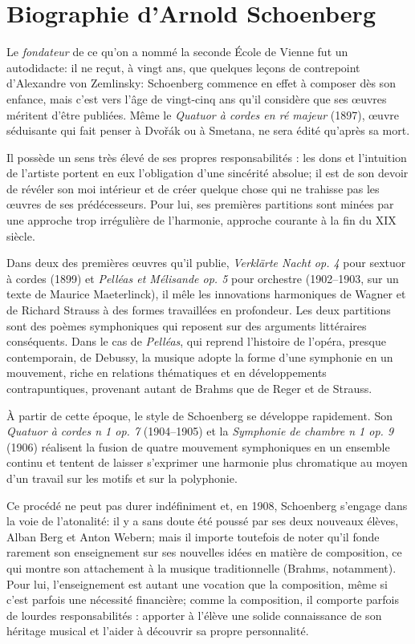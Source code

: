 \documentclass[11pt,a4paper]{scrreprt}
\begin{document}
\chapter{Biographie d'Arnold Schoenberg}
Le \emph{fondateur} de ce qu'on a nommé la seconde École de Vienne fut un autodidacte: il ne reçut, à vingt ans, que quelques leçons de contrepoint d'Alexandre von Zemlinsky: Schoenberg commence en effet à composer dès son enfance, mais c'est vers l'âge de vingt-cinq ans qu'il considère que ses \oe{}uvres méritent d'être publiées. Même le \emph{Quatuor à cordes en ré majeur} (1897), \oe{}uvre séduisante qui fait penser à Dvo\v{r}ák ou à Smetana, ne sera édité qu'après sa mort.

Il possède un sens très élevé de ses propres responsabilités : les dons et l'intuition de l'artiste portent en eux l'obligation d'une sincérité absolue; il est de son devoir de révéler son \og{} moi \fg{} intérieur et de créer quelque chose qui ne trahisse pas les \oe{}uvres de ses prédécesseurs. Pour lui, ses premières partitions sont minées par une approche trop irrégulière de l'harmonie, approche courante à la fin du XIX\ieme{} siècle.

Dans deux des premières \oe{}uvres qu'il publie, \emph{Verklärte Nacht op. 4} pour sextuor à cordes (1899) et \emph{Pelléas et Mélisande op. 5} pour orchestre (1902--1903, sur un texte de Maurice Maeterlinck), il mêle les innovations harmoniques de Wagner et de Richard Strauss à des formes travaillées en profondeur. Les deux partitions sont des poèmes symphoniques qui reposent sur des arguments littéraires conséquents. Dans le cas de \emph{Pelléas}, qui reprend l'histoire de l'opéra, presque contemporain, de Debussy, la musique adopte la forme d'une symphonie en un mouvement, riche en relations thématiques et en développements contrapuntiques, provenant autant de Brahms que de Reger et de Strauss.

À partir de cette époque, le style de Schoenberg se développe rapidement. Son \emph{Quatuor à cordes n 1 op. 7} (1904--1905) et la \emph{Symphonie de chambre n 1 op. 9} (1906) réalisent la fusion de quatre mouvement symphoniques en un ensemble continu et tentent de laisser s'exprimer une harmonie plus chromatique au moyen d'un travail sur les motifs et sur la polyphonie.

Ce procédé ne peut pas durer indéfiniment et, en 1908, Schoenberg s'engage dans la voie de l'atonalité: il y a sans doute été poussé par ses deux nouveaux élèves, Alban Berg et Anton Webern; mais il importe toutefois de noter qu'il fonde rarement son enseignement sur ses nouvelles idées en matière de composition, ce qui montre son attachement à la musique \og{} traditionnelle \fg{} (Brahms, notamment). Pour lui, l'enseignement est autant une vocation que la composition, même si c'est parfois une nécessité financière; comme la composition, il comporte parfois de lourdes responsabilités : apporter à l'élève une solide connaissance de son héritage musical et l'aider à découvrir sa propre personnalité.
\end{document}
